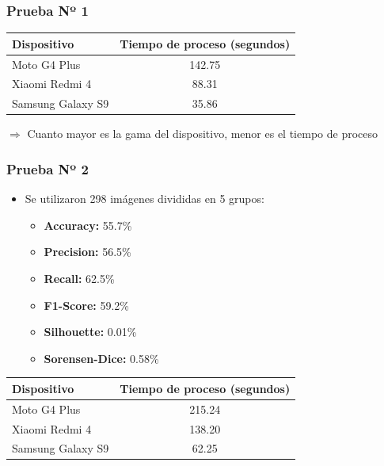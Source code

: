 \begin{frame}[t,fragile]
\frametitle {Prueba Nº 1}
\vspace{10mm}
\begin{table}[t]
	\begin{center}
		\label{tab:tiempo1}
		\begin{adjustbox}{max width=\textwidth}
			\begin{tabular}{l|c}
				\hline
				\hline
				\textbf{Dispositivo} & \textbf{Tiempo de proceso (segundos)}\\
				\hline
				Moto G4 Plus & 142.75\\
				
				Xiaomi Redmi 4 & 88.31\\
				
				Samsung Galaxy S9 & 35.86\\
				\hline
			\end{tabular}
		\end{adjustbox}
	\end{center}
\end{table}
\vspace{5mm}
\begin{center}
	$\Rightarrow$ Cuanto mayor es la gama del dispositivo, menor es el tiempo de proceso
\end{center}
\end{frame}
\begin{frame}[t,fragile]
\frametitle {Prueba Nº 2}
\begin{itemize}
	\item Se utilizaron 298 imágenes divididas en 5 grupos:
	\begin{itemize}
		\item \textbf{\color{red}Accuracy:} 55.7\%
		\item \textbf{\color{red}Precision:} 56.5\%
		\item \textbf{\color{red}Recall:} 62.5\%
		\item \textbf{\color{red}F1-Score:} 59.2\%
		\item \textbf{\color{blue}Silhouette:} 0.01\%
		\item \textbf{\color{blue}Sorensen-Dice:} 0.58\%
	\end{itemize}
\end{itemize}
\begin{table}[h!]
	\begin{center}
		\label{tab:tiempo2}
		\begin{adjustbox}{max width=\textwidth}
			\begin{tabular}{l|c}
				\hline
				\hline
				\textbf{Dispositivo} & \textbf{Tiempo de proceso (segundos)}\\
				\hline
				Moto G4 Plus & 215.24\\
				
				Xiaomi Redmi 4 & 138.20\\
				
				Samsung Galaxy S9 & 62.25\\
				\hline
			\end{tabular}
		\end{adjustbox}
	\end{center}
\end{table}
\end{frame}
